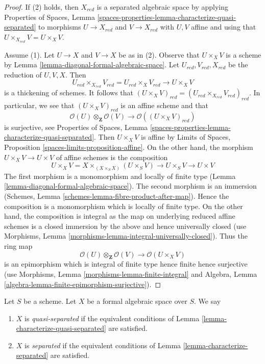 \begin{proof}
If (2) holds, then $X_{red}$ is a separated algebraic space
by applying Properties of Spaces, Lemma
\ref{spaces-properties-lemma-characterize-quasi-separated}
to morphisms $U \to X_{red}$ and $V \to X_{red}$
with $U, V$ affine and using that $U \times_{X_{red}} V = U \times_X V$.

\medskip\noindent
Assume (1). Let $U \to X$ and $V \to X$ be as in (2).
Observe that $U \times_X V$ is a scheme by
Lemma \ref{lemma-diagonal-formal-algebraic-space}.
Let $U_{red}, V_{red}, X_{red}$ be the reduction of $U, V, X$.
Then
$$
U_{red} \times_{X_{red}} V_{red} = U_{red} \times_X V_{red} \to U \times_X V
$$
is a thickening of schemes. It follows that
$(U \times_X V)_{red} = (U_{red} \times_{X_{red}} V_{red})_{red}$.
In particular, we see that $(U \times_X V)_{red}$ is an affine scheme
and that
$$
\mathcal{O}(U) \otimes_\mathbf{Z} \mathcal{O}(V)
\longrightarrow
\mathcal{O}((U \times_X V)_{red})
$$
is surjective, see Properties of Spaces, Lemma
\ref{spaces-properties-lemma-characterize-quasi-separated}.
Then $U \times_X V$ is affine by
Limits of Spaces, Proposition \ref{spaces-limits-proposition-affine}.
On the other hand, the morphism $U \times_X V \to U \times V$
of affine schemes is the composition
$$
U \times_X V = X \times_{(X \times_S X)} (U \times_S V)
\to U \times_S V \to U \times V
$$
The first morphism is a monomorphism and locally of finite type
(Lemma \ref{lemma-diagonal-formal-algebraic-space}).
The second morphism is an immersion
(Schemes, Lemma \ref{schemes-lemma-fibre-product-after-map}).
Hence the composition is a monomorphism which is locally of finite type.
On the other hand, the composition is integral as the map on
underlying reduced affine schemes is a closed immersion
by the above and hence universally closed (use
Morphisms, Lemma \ref{morphisms-lemma-integral-universally-closed}).
Thus the ring map
$$
\mathcal{O}(U) \otimes_\mathbf{Z} \mathcal{O}(V)
\longrightarrow
\mathcal{O}(U \times_X V)
$$
is an epimorphism which is integral of finite type
hence finite hence surjective (use
Morphisms, Lemma \ref{morphisms-lemma-finite-integral}
and
Algebra, Lemma \ref{algebra-lemma-finite-epimorphism-surjective}).
\end{proof}

\begin{definition}
\label{definition-separated}
Let $S$ be a scheme. Let $X$ be a formal algebraic space over $S$.
We say
\begin{enumerate}
\item $X$ is {\it quasi-separated} if the equivalent conditions of
Lemma \ref{lemma-characterize-quasi-separated} are satisfied.
\item $X$ is {\it separated} if the equivalent conditions of
Lemma \ref{lemma-characterize-separated} are satisfied.
\end{enumerate}
\end{definition}






